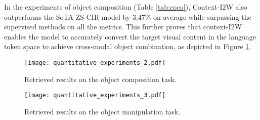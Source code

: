 \documentclass[letterpaper]{article} \usepackage{aaai24}  \usepackage{times}  \usepackage{helvet}  \usepackage{courier}  \usepackage[hyphens]{url}  \usepackage{graphicx} \urlstyle{rm} \def\UrlFont{\rm}  \usepackage{natbib}  \usepackage{caption} \frenchspacing  \setlength{\pdfpagewidth}{8.5in} \setlength{\pdfpageheight}{11in} \usepackage{algorithm}
\begin{document}
In the experiments of object composition (Table \ref{tab:coco}), Context-I2W also outperforms the SoTA ZS-CIR model by 3.47\% on average while surpassing the supervised methods on all the metrics. This further proves that context-I2W enables the model to accurately convert the target visual content in the language token space to achieve cross-modal object combination, as depicted in Figure \ref{fig:coco}.

\begin{figure}[t]
    \centering
\centering
    \texttt{[image: quantitative\_experiments\_2.pdf]}
    \caption{Retrieved results on the object composition task.}
\label{fig:coco}
\end{figure}



\begin{figure}[t]
    \centering
\centering
    \texttt{[image: quantitative\_experiments\_3.pdf]}
    \caption{Retrieved results on the object manipulation task.}
    \vspace{-10pt}
    \label{fig:cirr}
\end{figure}
\end{document}

